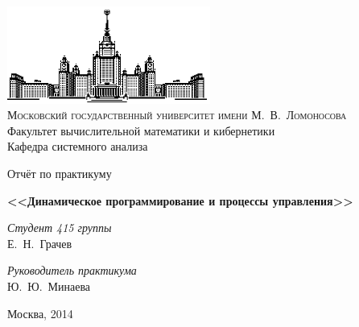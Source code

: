 \documentclass[12pt]{article}
\begin{document}
\thispagestyle{empty}

\begin{center}
\ \vspace{-3cm}

\includegraphics[width=0.5\textwidth]{msu.eps}\\

{\scshape Московский государственный университет имени М.~В.~Ломоносова}\\
Факультет вычислительной математики и кибернетики\\
Кафедра системного анализа

\vfill

{\LARGE Отчёт по практикуму}

\vspace{1cm}

{\Huge\bfseries <<Динамическое программирование и процессы управления>>} \\

\end{center}

\vspace{1cm}

\begin{flushright}
  \large
  \textit{Студент 415 группы}\\
  Е.~Н.~Грачев

  \vspace{5mm}

  \textit{Руководитель практикума}\\
  Ю.~Ю.~Минаева
\end{flushright}

\vfill

\begin{center}
Москва, 2014
\end{center}

\pagebreak
\tableofcontents
\pagebreak

\newtheorem{definition} {Определение}
\newtheorem{option} {Свойство}
\newtheorem{theorem} {Теорема}
\end{document}
